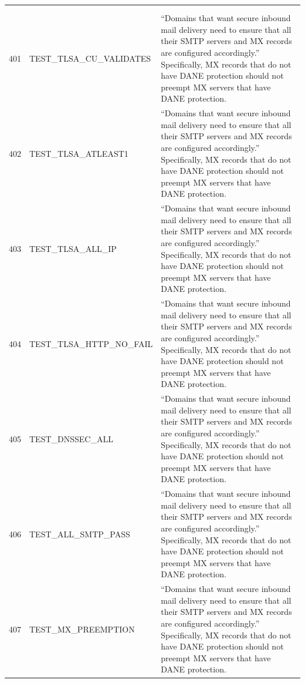 \documentclass[preprint,3p,11pt]{elsarticle}
\begin{document}
\begin{center}
\begin{longtable}{|>{\small}l>{\small}l>{\small}p{3.25in}|}
\multicolumn{3}{|c|}{}\\
\multicolumn{3}{|c|}{\textbf{\large 401-407: Ensemble results}}\\
401 & TEST\_TLSA\_CU\_VALIDATES &  ``Domains that want secure inbound mail delivery need to ensure that all their SMTP servers and MX records are configured accordingly.'' Specifically, MX records that do not have DANE protection should not preempt MX servers that have DANE protection.\\
402 & TEST\_TLSA\_ATLEAST1   &  ``Domains that want secure inbound mail delivery need to ensure that all their SMTP servers and MX records are configured accordingly.'' Specifically, MX records that do not have DANE protection should not preempt MX servers that have DANE protection.\\
403 & TEST\_TLSA\_ALL\_IP     &  ``Domains that want secure inbound mail delivery need to ensure that all their SMTP servers and MX records are configured accordingly.'' Specifically, MX records that do not have DANE protection should not preempt MX servers that have DANE protection.\\
404 & TEST\_TLSA\_HTTP\_NO\_FAIL &  ``Domains that want secure inbound mail delivery need to ensure that all their SMTP servers and MX records are configured accordingly.'' Specifically, MX records that do not have DANE protection should not preempt MX servers that have DANE protection.\\
405 & TEST\_DNSSEC\_ALL      &  ``Domains that want secure inbound mail delivery need to ensure that all their SMTP servers and MX records are configured accordingly.'' Specifically, MX records that do not have DANE protection should not preempt MX servers that have DANE protection.\\
406 & TEST\_ALL\_SMTP\_PASS   &  ``Domains that want secure inbound mail delivery need to ensure that all their SMTP servers and MX records are configured accordingly.'' Specifically, MX records that do not have DANE protection should not preempt MX servers that have DANE protection.\\
407 & TEST\_MX\_PREEMPTION   &  ``Domains that want secure inbound mail delivery need to ensure that all their SMTP servers and MX records are configured accordingly.'' Specifically, MX records that do not have DANE protection should not preempt MX servers that have DANE protection.\\
\end{longtable}
\end{center}
\end{document}
